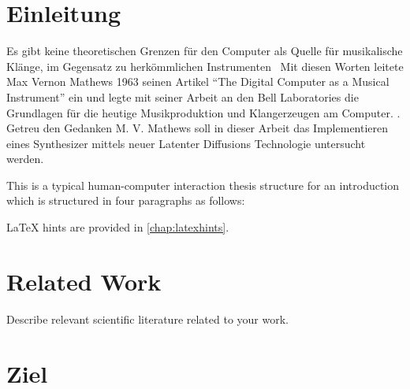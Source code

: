 \documentclass[
  a4paper,  %
  twoside,  %
  bibliography=totoc,
  headsepline,
  cleardoublepage=empty,
  parskip=half,
  draft=false
]{scrbook}
\begin{document}
%
%


\chapter{Einleitung}
\label{sec:introduction}

\glqq Es gibt keine theoretischen Grenzen für den Computer als Quelle für musikalische Klänge, im Gegensatz zu herkömmlichen Instrumenten \grqq\, 
\cite{mathews_digital_1963} Mit diesen Worten leitete Max Vernon Mathews 1963 seinen Artikel ``The Digital Computer as a Musical Instrument'' ein und legte mit seiner Arbeit an den Bell Laboratories die Grundlagen für die heutige Musikproduktion und Klangerzeugen am Computer. \cite{mathews_music_2004}. Getreu den Gedanken M. V. Mathews soll in dieser Arbeit das Implementieren eines Synthesizer mittels neuer Latenter Diffusions Technologie untersucht werden.  

This is a typical human-computer interaction thesis structure for an introduction which is structured in four paragraphs as follows:




LaTeX hints are provided in \autoref{chap:latexhints}.

\chapter{Related Work}

Describe relevant scientific literature related to your work.

\chapter{Ziel}
\end{document}
